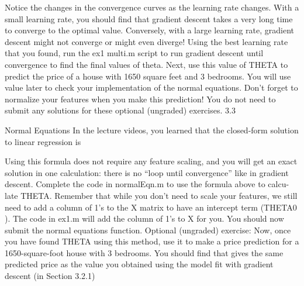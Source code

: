 \documentclass[12pt,a4paper]{article}
\begin{document}
Notice the changes in the convergence curves as the learning rate changes.
With a small learning rate, you should find that gradient descent takes a very
long time to converge to the optimal value. Conversely, with a large learning
rate, gradient descent might not converge or might even diverge!
Using the best learning rate that you found, run the ex1 multi.m script
to run gradient descent until convergence to find the final values of theta.
Next, use this value of THETA to predict the price of a house with 1650 square
feet and 3 bedrooms. You will use value later to check your implementation of the
normal equations. Don’t forget to normalize your features when you make
this prediction!
You do not need to submit any solutions for these optional (ungraded)
exercises.
3.3

Normal Equations
In the lecture videos, you learned that the closed-form solution to linear
regression is

Using this formula does not require any feature scaling, and you will get
an exact solution in one calculation: there is no “loop until convergence” like
in gradient descent.
Complete the code in normalEqn.m to use the formula above to calcu-
late THETA. Remember that while you don’t need to scale your features, we still
need to add a column of 1’s to the X matrix to have an intercept term (THETA0 ).
The code in ex1.m will add the column of 1’s to X for you.
You should now submit the normal equations function.
Optional (ungraded) exercise: Now, once you have found THETA using this
method, use it to make a price prediction for a 1650-square-foot house with
3 bedrooms. You should find that gives the same predicted price as the value
you obtained using the model fit with gradient descent (in Section 3.2.1)
\end{document}
